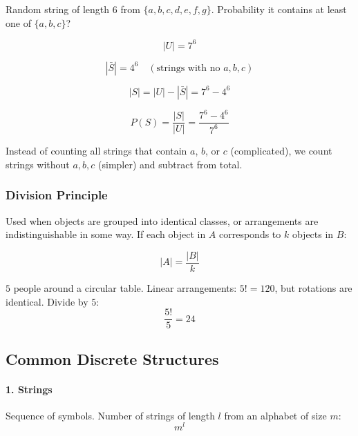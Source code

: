 \begin{eg}
Random string of length 6 from $\{a,b,c,d,e,f,g\}$. Probability it contains at least one of $\{a,b,c\}$?

\[
|U| = 7^6
\]

\[
|\bar{S}| = 4^6 \quad (\text{strings with no } a,b,c)
\]

\[
|S| = |U| - |\bar{S}| = 7^6 - 4^6
\]

\[
P(S) = \frac{|S|}{|U|} = \frac{7^6 - 4^6}{7^6}
\]

\begin{explanation}
Instead of counting all strings that contain $a$, $b$, or $c$ (complicated), we count strings without $a,b,c$ (simpler) and subtract from total.
\end{explanation}
\end{eg}

\subsubsection{Division Principle} 
\begin{explanation}
Used when objects are grouped into identical classes, or arrangements are indistinguishable in some way. If each object in $A$ corresponds to $k$ objects in $B$:

\[
|A| = \frac{|B|}{k}
\]
\end{explanation}

\begin{eg}
$5$ people around a circular table. Linear arrangements: $5! = 120$, but rotations are identical. Divide by $5$:
\[
\frac{5!}{5} = 24
\]
\end{eg}

\subsection{Common Discrete Structures}

\paragraph{1. Strings}  
Sequence of symbols. Number of strings of length $l$ from an alphabet of size $m$:
\[
m^l
\]

